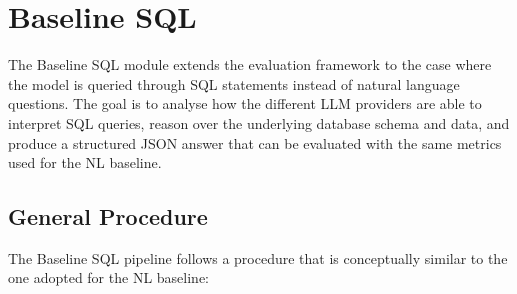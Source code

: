 \documentclass[12pt,a4paper]{article}
\begin{document}
\section{Baseline SQL}
\label{sec:baseline-sql}

The Baseline SQL module extends the evaluation framework to the case where the
model is queried through SQL statements instead of natural language questions.
The goal is to analyse how the different LLM providers are able to interpret
SQL queries, reason over the underlying database schema and data, and produce
a structured JSON answer that can be evaluated with the same metrics used for
the NL baseline.

\subsection{General Procedure}

The Baseline SQL pipeline follows a procedure that is conceptually similar to
the one adopted for the NL baseline:
\end{document}
